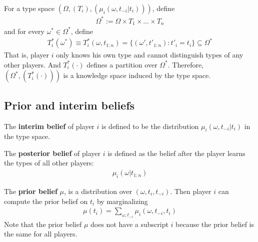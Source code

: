 \documentclass{article}
\begin{document}
   	\begin{proposition}
   		For a type space $(\Omega, (T_i), (\mu_i(\omega, t_{-i}|t_i)))$, define
   		\begin{align}
   			\Omega^{*}:=\Omega \times T_{1} \times \ldots \times T_{n}
   		\end{align}
   		and for every $\omega^* \in \Omega^*$, define
   		\begin{align}
   			T^*_i(\omega^*) \equiv T^*_i(\omega, t_{1:n}) = \{(\omega', t'_{1:n}): t'_i = t_i \} \subseteq \Omega^*
   		\end{align}
   		That is, player $i$ only knows his own type and cannot distinguish types of any other players. And $T^*_i(\cdot)$  defines a partition over $\Omega^*$. Therefore, $(\Omega^*, (T^*_i(\cdot)))$ is a knowledge space induced by the type space.
   	\end{proposition}
   	
   	\subsection{Prior and interim beliefs}
   	
   	\begin{definition}
   		The \textbf{interim belief} of player $i$ is defined to be the distribution $\mu_i(\omega, t_{-i}|t_i)$ in the type space.
   	\end{definition}
   	
   	\begin{definition}
   		The \textbf{posterior belief} of player $i$ is defined as the belief after the player learns the types of all other players:
   		\begin{align}
   			\mu_i(\omega|t_{1:n})
   		\end{align}
   	\end{definition}
   	
   	\begin{definition}
   		The \textbf{prior belief} $\mu$, is a distribution over $(\omega, t_i, t_{-i})$. Then player $i$ can compute the prior belief on $t_i$ by marginalizing
   		\begin{align}
   			\mu\left(t_{i}\right)=\sum_{\omega, t_{-i}} \mu_{i}\left(\omega, t_{-i}, t_{i}\right)
   		\end{align}
   		Note that the prior belief $\mu$ does not have a subscript $i$ because the prior belief is the same for all players.
   	\end{definition}
   	
\end{document}
